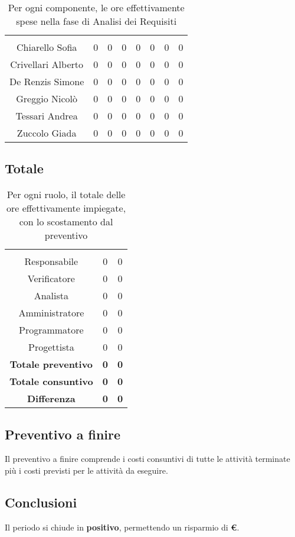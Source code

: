 \begin{table}[H]
	\begin{center}
		\begin{tabular}{c
				!{\color[HTML]{9b240a}\vrule width 1pt}
				cccccc
				!{\color[HTML]{9b240a}\vrule width 1pt}	
				c}
			\rowcolorhead
			 &  &  &  &  &  &  &  \\
			
			Chiarello Sofia & 0 & 0 & 0 & 0 & 0 & 0 & 0\\
			Crivellari Alberto & 0 & 0 & 0 & 0 & 0 & 0 & 0\\
			De Renzis Simone & 0 & 0 & 0 & 0 & 0 & 0 & 0\\
			Greggio Nicolò & 0 & 0 & 0 & 0 & 0 & 0 & 0\\
			Tessari Andrea & 0 & 0 & 0 & 0 & 0 & 0 & 0\\
			Zuccolo Giada & 0 & 0 & 0 & 0 & 0 & 0 & 0\\
		\end{tabular}
		\caption[Consuntivo fase di Analisi dei Requisiti]{Per ogni componente, le ore effettivamente spese nella fase di Analisi dei Requisiti}
	\end{center}
\end{table}



\subsection{Totale}

\begin{table}[H]
	\centering
	\begin{tabular}{ccc}
		\rowcolorhead
		\headertitle{Ruolo} & \headertitle{Ore} & \headertitle{Costo(€)}\\
		Responsabile & 0 & 0\\
		Verificatore & 0 & 0\\
		Analista & 0 & 0\\				
		Amministratore & 0 & 0\\
		Programmatore & 0 & 0\\
		Progettista & 0 & 0\\
		\hline
		\textbf{Totale preventivo} & \textbf{0} & \textbf{0}\\
		\textbf{Totale consuntivo} & \textbf{0} & \textbf{0}\\
		\textbf{Differenza} & \textbf{0} & \textbf{0}\\
	\end{tabular}
	\caption[Confronto tra preventivo e consuntivo]{Per ogni ruolo, il totale delle ore effettivamente impiegate, con lo scostamento dal preventivo}
\end{table}


\subsection{Preventivo a finire}
Il preventivo a finire comprende i costi consuntivi di tutte le attività terminate più i costi previsti per le attività da eseguire. 



\subsection{Conclusioni}

Il periodo si chiude in \textbf{positivo}, permettendo un risparmio di \textbf{ €}.
